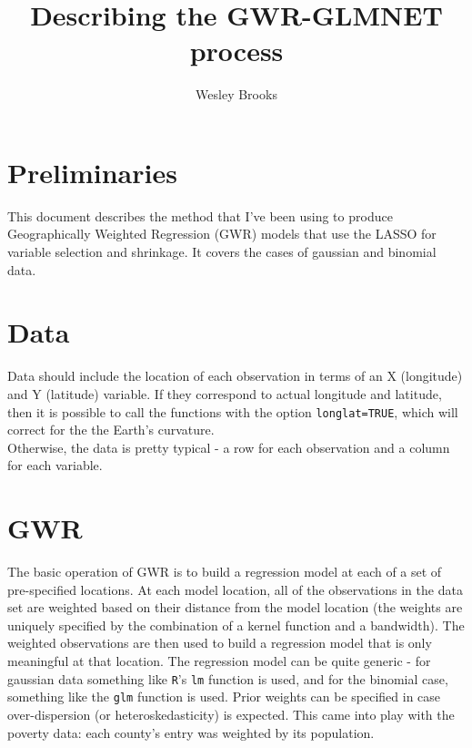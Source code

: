 \documentclass[10pt]{amsart}
\title{Describing the GWR-GLMNET process}
\author{Wesley Brooks}
\date{}                                           %
\begin{document}
\maketitle





\section{Preliminaries}
This document describes the method that I've been using to produce Geographically Weighted Regression (GWR) models that use the LASSO for variable selection and shrinkage. It covers the cases of gaussian and binomial data.

\section{Data}
Data should include the location of each observation in terms of an X (longitude) and Y (latitude) variable. If they correspond to actual longitude and latitude, then it is possible to call the functions with the option \verb!longlat=TRUE!, which will correct for the the Earth's curvature.\\

Otherwise, the data is pretty typical - a row for each observation and a column for each variable.\\

\section{GWR}
The basic operation of GWR is to build a regression model at each of a set of pre-specified locations. At each model location, all of the observations in the data set are weighted based on their distance from the model location (the weights are uniquely specified by the combination of a kernel function and a bandwidth). The weighted observations are then used to build a regression model that is only meaningful at that location. The regression model can be quite generic - for gaussian data something like \verb!R!'s \verb!lm! function is used, and for the binomial case, something like the \verb!glm! function is used. Prior weights can be specified in case over-dispersion (or heteroskedasticity) is expected. This came into play with the poverty data: each county's entry was weighted by its population.\\
\end{document}
